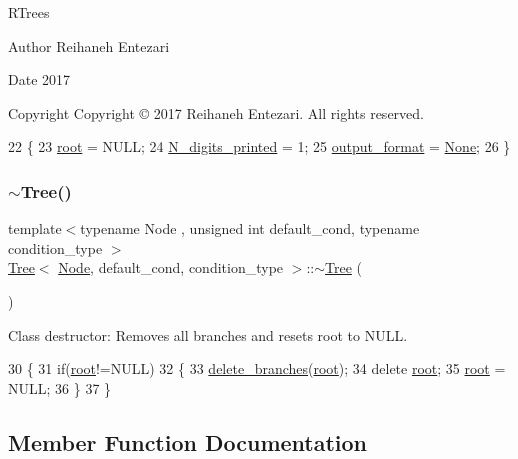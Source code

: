R\+Trees \begin{DoxyAuthor}{Author}
Reihaneh Entezari 
\end{DoxyAuthor}
\begin{DoxyDate}{Date}
2017 
\end{DoxyDate}
\begin{DoxyCopyright}{Copyright}
Copyright © 2017 Reihaneh Entezari. All rights reserved. 
\end{DoxyCopyright}

\begin{DoxyCode}
22 \{
23     \hyperlink{class_tree_ae1cb548295b2e451164d89b16ac72d17}{root} = NULL;
24     \hyperlink{class_tree_ad24ef7cae6a7c0226280cf56bbc25f53}{N\_digits\_printed} = 1;
25     \hyperlink{class_tree_aeaf14b04be7b3de8214fcc5c1545ebde}{output\_format} = \hyperlink{_tree_8hpp_a73f5f76e6617ce240bad0b57b80be996ac9d3e887722f2bc482bcca9d41c512af}{None};
26 \}
\end{DoxyCode}
\mbox{\label{class_tree_aa4d8eec83dea9da55071cdf181078119}} 
\subsubsection{\texorpdfstring{$\sim$\+Tree()}{~Tree()}}
{\footnotesize\ttfamily template$<$typename Node , unsigned int default\+\_\+cond, typename condition\+\_\+type $>$ \\
\hyperlink{class_tree}{Tree}$<$ \hyperlink{struct_node}{Node}, default\+\_\+cond, condition\+\_\+type $>$\+::$\sim$\hyperlink{class_tree}{Tree} (\begin{DoxyParamCaption}{ }\end{DoxyParamCaption})}

Class destructor\+: Removes all branches and resets {\ttfamily root} to N\+U\+LL. 
\begin{DoxyCode}
30 \{
31     \textcolor{keywordflow}{if}(\hyperlink{class_tree_ae1cb548295b2e451164d89b16ac72d17}{root}!=NULL)
32     \{
33         \hyperlink{class_tree_ae78f42d798cdd24b3d5b24621b939468}{delete\_branches}(\hyperlink{class_tree_ae1cb548295b2e451164d89b16ac72d17}{root});
34         \textcolor{keyword}{delete} \hyperlink{class_tree_ae1cb548295b2e451164d89b16ac72d17}{root};
35         \hyperlink{class_tree_ae1cb548295b2e451164d89b16ac72d17}{root} = NULL;
36     \}
37 \}
\end{DoxyCode}


\subsection{Member Function Documentation}
\mbox{\label{class_tree_af8292ba7cef24827af0584b31cfc33a8}} 
